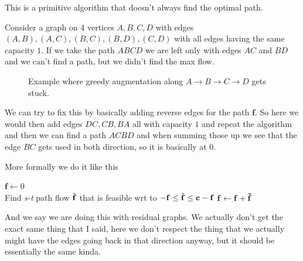 This is a primitive algorithm that doesn't always find the optimal path. 

Consider a graph on 4 vertices $A, B ,C ,D$ with edges $(A,B), (A,C), (B, C), (B,D), (C,D)$ with all edges having the same capacity $1$. If we take the path $ABCD$ we are left only with edges $AC$ and $BD$ and we can't find a path, but we didn't find the max flow.

\begin{figure}[h]
\centering
{}
\caption{Example where greedy augmentation along $A\to B\to C\to D$ gets stuck.}
\end{figure}

We can try to fix this by basically adding reverse edges for the path $\mathbf{f}$. So here we would then add edges $DC, CB, BA$ all with capacity $1$ and repeat the algorithm and then we can find a path $ACBD$ and when summing those up we see that the edge $BC$ gets used in both direction, so it is basically at $0$.

More formally we do it like this

\begin{algorithm}
\caption{Second try at algo}\label{alg:second}
\begin{algorithmic}
\State $\mathbf{f} \gets 0$
\While{}\\
    Find \emph{s-t} path flow $\Tilde{\mathbf{f}}$ that is feasible wrt to $ - \mathbf{f} \leq \Tilde{\mathbf{f}} \leq \mathbf{c - f}$
    \State $ \mathbf{f} \gets \mathbf{f + \Tilde{\mathbf{f}}}$
\EndWhile
\end{algorithmic}
\end{algorithm}

And we say we are doing this with residual graphs. We actually don't get the exact same thing that I said, here we don't respect the thing that we actually might have the edges going back in that direction anyway, but it should be essentially the same kinda.

